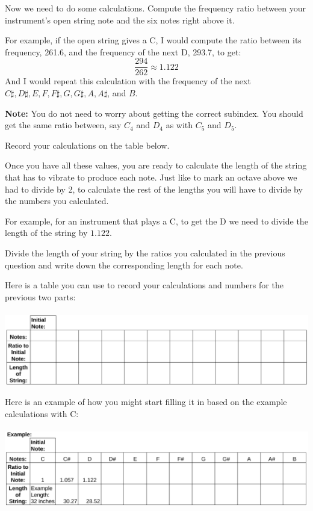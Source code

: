 \documentclass[12pt,noauthor,nooutcomes,hints,instructornotes]{ximera}%
\begin{document}
\begin{question}
Now we need to do some calculations. Compute the frequency ratio between your instrument's open string note and the six notes right above it. 
    
    For example, if the open string gives a C, I would compute the ratio between its frequency, 261.6, and the frequency of the next D, 293.7, to get:
\[
\frac{294}{262}\approx1.122
\]
And I would repeat this calculation with the frequency of the next $C\sharp, D\sharp, E, F, F\sharp, G, G\sharp, A, A\sharp$, and $B$.
    
    \noStaff
    
    

\textbf{Note:} You do not need to worry about getting the correct subindex. You should get the same ratio between, say $C_4$ and $D_4$ as with $C_5$ and $D_5$.

Record your calculations on the table below.
\end{question}

\begin{question}
Once you have all these values, you are ready to calculate the length of the string that has to vibrate to produce each note. Just like to mark an octave above we had to divide by 2, to calculate the rest of the lengths you will have to divide by the numbers you calculated.

For example, for an instrument that plays a C, to get the D we need to divide the length of the string by $1.122$.

Divide the length of your string by the ratios you calculated in the previous question and write down the corresponding length for each note.

Here is a table you can use to record your calculations and numbers for the previous two parts:\\
\\
\includegraphics[width=\textwidth]{ratio-notes-table.png}

Here is an example of how you might start filling it in based on the example calculations with C:\\
\\
\includegraphics[width=\textwidth]{example-table.png}
\end{question}
    
\end{document}
